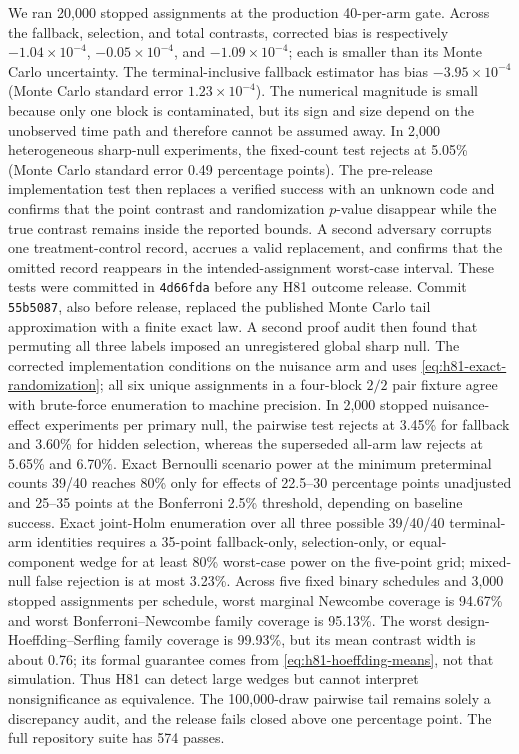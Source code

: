 \documentclass[11pt]{article}
\newcommand{\1}{\mathbf{1}}
\begin{document}
We ran 20,000 stopped assignments at the production 40-per-arm gate.  Across the
fallback, selection, and total contrasts, corrected bias is respectively
$-1.04\times10^{-4}$, $-0.05\times10^{-4}$, and
$-1.09\times10^{-4}$; each is smaller than its Monte Carlo uncertainty.  The
terminal-inclusive fallback estimator has bias $-3.95\times10^{-4}$ (Monte Carlo
standard error $1.23\times10^{-4}$).  The numerical magnitude is small because
only one block is contaminated, but its sign and size depend on the unobserved
time path and therefore cannot be assumed away.  In 2,000 heterogeneous
sharp-null experiments, the fixed-count test rejects at 5.05\% (Monte Carlo
standard error 0.49 percentage points).
The pre-release implementation test then replaces a verified success with an
unknown code and confirms that the point contrast and randomization $p$-value
disappear while the true contrast remains inside the reported bounds.  A second
adversary corrupts one treatment-control record, accrues a valid replacement,
and confirms that the omitted record reappears in the intended-assignment
worst-case interval.  These tests were committed in \texttt{4d66fda} before any
H81 outcome release.  Commit \texttt{55b5087}, also before release, replaced the
published Monte Carlo tail approximation with a finite exact law.  A second
proof audit then found that permuting all three labels imposed an unregistered
global sharp null.  The corrected implementation conditions on the nuisance arm
and uses \cref{eq:h81-exact-randomization}; all six unique assignments in a
four-block $2/2$ pair fixture agree with brute-force enumeration to machine
precision.  In 2,000 stopped nuisance-effect experiments per primary null, the
pairwise test rejects at 3.45\% for fallback and 3.60\% for hidden selection,
whereas the superseded all-arm law rejects at 5.65\% and 6.70\%.  Exact Bernoulli
scenario power at the minimum preterminal counts 39/40 reaches 80\% only for
effects of 22.5--30 percentage points unadjusted and 25--35 points at the
Bonferroni 2.5\% threshold, depending on baseline success.  Exact joint-Holm
enumeration over all three possible 39/40/40 terminal-arm identities requires a
35-point fallback-only, selection-only, or equal-component wedge for at least
80\% worst-case power on the five-point grid; mixed-null false rejection is at
most 3.23\%.  Across five fixed binary schedules and 3,000 stopped assignments
per schedule, worst marginal Newcombe coverage is 94.67\% and worst
Bonferroni--Newcombe family coverage is 95.13\%.  The worst
design-Hoeffding--Serfling family coverage is 99.93\%, but its mean contrast
width is about 0.76; its
formal guarantee comes from \cref{eq:h81-hoeffding-means}, not that simulation.
Thus H81 can detect large wedges but cannot interpret nonsignificance as
equivalence.  The
100,000-draw pairwise tail remains solely a discrepancy audit, and the release
fails closed above one percentage point.  The full repository suite has 574
passes.
\end{document}
